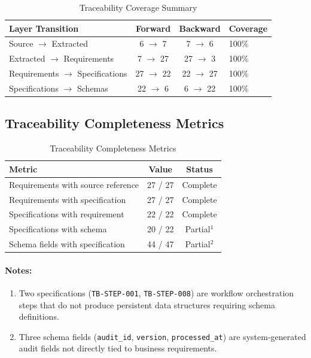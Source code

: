 \documentclass[11pt,a4paper,twoside]{report}
\newcommand{\specref}[1]{\texttt{#1}}
\newcommand{\fieldref}[1]{\textcolor{sapblue}{\texttt{#1}}}
\begin{document}
\begin{table}[h]
\centering
\caption{Traceability Coverage Summary}
\label{tab:coverage-summary}
\begin{tabular}{@{}lccl@{}}
\toprule
\textbf{Layer Transition} & \textbf{Forward} & \textbf{Backward} & \textbf{Coverage} \\
\midrule
Source $\rightarrow$ Extracted & 6 $\rightarrow$ 7 & 7 $\rightarrow$ 6 & 100\% \\
Extracted $\rightarrow$ Requirements & 7 $\rightarrow$ 27 & 27 $\rightarrow$ 3 & 100\% \\
Requirements $\rightarrow$ Specifications & 27 $\rightarrow$ 22 & 22 $\rightarrow$ 27 & 100\% \\
Specifications $\rightarrow$ Schemas & 22 $\rightarrow$ 6 & 6 $\rightarrow$ 22 & 100\% \\
\bottomrule
\end{tabular}
\end{table}

\subsection{Traceability Completeness Metrics}

\begin{table}[h]
\centering
\caption{Traceability Completeness Metrics}
\label{tab:completeness-metrics}
\begin{tabular}{@{}lcc@{}}
\toprule
\textbf{Metric} & \textbf{Value} & \textbf{Status} \\
\midrule
Requirements with source reference & 27 / 27 & \textcolor{sourcegreen}{Complete} \\
Requirements with specification & 27 / 27 & \textcolor{sourcegreen}{Complete} \\
Specifications with requirement & 22 / 22 & \textcolor{sourcegreen}{Complete} \\
Specifications with schema & 20 / 22 & \textcolor{sapamber}{Partial}$^1$ \\
Schema fields with specification & 44 / 47 & \textcolor{sapamber}{Partial}$^2$ \\
\bottomrule
\end{tabular}
\end{table}

\paragraph{Notes:}
\begin{enumerate}
\item Two specifications (\specref{TB-STEP-001}, \specref{TB-STEP-008}) are
workflow orchestration steps that do not produce persistent data
structures requiring schema definitions.
\item Three schema fields (\fieldref{audit\_id}, \fieldref{version},
\fieldref{processed\_at}) are system-generated audit fields not
directly tied to business requirements.
\end{enumerate}
\end{document}
